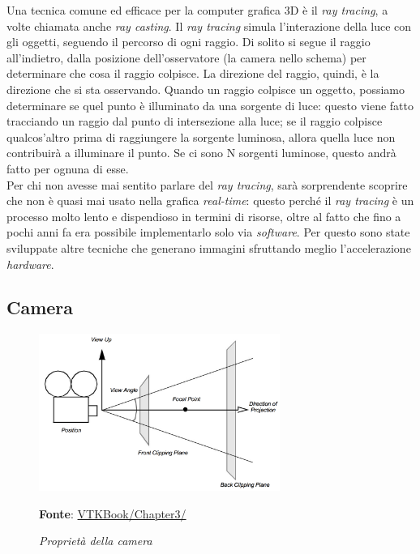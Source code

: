 Una tecnica comune ed efficace per la computer grafica 3D è il \emph{ray tracing}, a volte chiamata anche \emph{ray casting}. Il \emph{ray tracing} simula l'interazione della luce con gli oggetti, seguendo il percorso di ogni raggio. Di solito si segue il raggio all'indietro, dalla posizione dell'osservatore (la camera nello schema) per determinare che cosa il raggio colpisce. La direzione del raggio, quindi, è la direzione che si sta osservando. Quando un raggio colpisce un oggetto, possiamo determinare se quel punto è illuminato da una sorgente di luce: questo viene fatto tracciando un raggio dal punto di intersezione alla luce; se il raggio colpisce qualcos'altro prima di raggiungere la sorgente luminosa, allora quella luce non contribuirà a illuminare il punto. Se ci sono N sorgenti luminose, questo andrà fatto per ognuna di esse.
\\
Per chi non avesse mai sentito parlare del \emph{ray tracing}, sarà sorprendente scoprire che non è quasi mai usato nella grafica \emph{real-time}: questo perché il \emph{ray tracing} è un processo molto lento e dispendioso in termini di risorse, oltre al fatto che fino a pochi anni fa era possibile implementarlo solo via \emph{software}. Per questo sono state sviluppate altre tecniche che generano immagini sfruttando meglio l'accelerazione \emph{hardware}.

\subsection{Camera}
\begin{figure}[h]
    \centering
    \includegraphics[width=0.7\textwidth]{immagini/volumerendering/camera.png}
    \caption{\textit{Proprietà della camera}}
    \textbf{Fonte}: \href{https://lorensen.github.io/VTKExamples/site/VTKBook/03Chapter3/}{VTKBook/Chapter3/}
    \label{fig: Proprietà Camera}
\end{figure}

